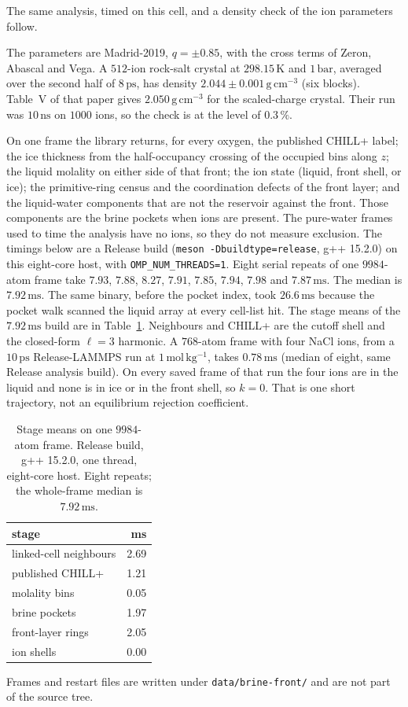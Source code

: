 The same analysis, timed on this cell, and a density check of the
ion parameters follow.

The parameters are Madrid-2019, $q=\pm 0.85$, with the cross terms
of Zeron, Abascal and Vega.\cite{zeron2019}
A $512$-ion rock-salt crystal at $298.15\,\mathrm{K}$ and
$1\,\mathrm{bar}$, averaged over the second half of $8\,\mathrm{ps}$,
has density $2.044\pm 0.001\,\mathrm{g\,cm^{-3}}$ (six blocks).
Table~V of that paper gives $2.050\,\mathrm{g\,cm^{-3}}$ for the
scaled-charge crystal.
Their run was $10\,\mathrm{ns}$ on $1000$ ions, so the check is at
the level of $0.3\,\%$.

On one frame the library returns, for every oxygen, the published
CHILL+ label; the ice thickness from the half-occupancy crossing of
the occupied bins along $z$; the liquid molality on either side of
that front; the ion state (liquid, front shell, or ice); the
primitive-ring census and the coordination defects of the front
layer; and the liquid-water components that are not the reservoir
against the front.
Those components are the brine pockets when ions are present.
The pure-water frames used to time the analysis have no ions, so
they do not measure exclusion.
The timings below are a Release build
(\texttt{meson -Dbuildtype=release}, g++ 15.2.0) on this eight-core
host, with \texttt{OMP\_NUM\_THREADS=1}.
Eight serial repeats of one $9984$-atom frame take
$7.93$, $7.88$, $8.27$, $7.91$, $7.85$, $7.94$, $7.98$ and
$7.87\,\mathrm{ms}$.
The median is $7.92\,\mathrm{ms}$.
The same binary, before the pocket index, took $26.6\,\mathrm{ms}$
because the pocket walk scanned the liquid array at every cell-list hit.
The stage means of the $7.92\,\mathrm{ms}$ build are in
Table~\ref{tab:brine-stage}.
Neighbours and CHILL+ are the cutoff shell and the closed-form
$\ell=3$ harmonic.
A $768$-atom frame with four NaCl ions, from a $10\,\mathrm{ps}$
Release-LAMMPS run at $1\,\mathrm{mol\,kg^{-1}}$, takes $0.78\,\mathrm{ms}$
(median of eight, same Release analysis build).
On every saved frame of that run the four ions are in the liquid
and none is in ice or in the front shell, so $k=0$.
That is one short trajectory, not an equilibrium rejection coefficient.

\begin{table}[t]
\centering
\caption{Stage means on one $9984$-atom frame.
Release build, g++ 15.2.0, one thread, eight-core host.
Eight repeats; the whole-frame median is $7.92\,\mathrm{ms}$.}
\label{tab:brine-stage}
\begin{tabular}{lr}
\hline
stage & ms \\
\hline
linked-cell neighbours & 2.69 \\
published CHILL+ & 1.21 \\
molality bins & 0.05 \\
brine pockets & 1.97 \\
front-layer rings & 2.05 \\
ion shells & 0.00 \\
\hline
\end{tabular}
\end{table}
Frames and restart files are written under \texttt{data/brine-front/}
and are not part of the source tree.

